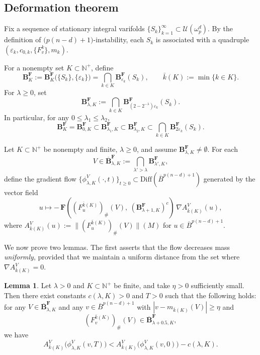 \documentclass[12pt,english]{article}
\theoremstyle{definition}
\newtheorem{lemma}[theorem]{Lemma}
\begin{document}
\subsection{Deformation theorem}\label{subsec-deform}

Fix a sequence of stationary integral varifolds \(\{S_k\}_{k=1}^\infty \subset \mathcal{U}(\omega^d_p)\). By the definition of \(\bigl(p(n-d)+1\bigr)\)-instability, each \(S_k\) is associated with a quadruple \((\varepsilon_k, c_{0,k}, \{F^k_v\}, m_k)\).

For a nonempty set \(K\subset \mathbb{N}^+\), define
\[
\mathbf{B}^{\mathbf F}_K
:= \mathbf{B}^{\mathbf F}_K\bigl(\{S_k\},\{\varepsilon_k\}\bigr)
= \bigcap_{k\in K}\mathbf{B}^{\mathbf F}_{\varepsilon_k}(S_k),
\qquad
\bar{k}(K):=\min\{k\in K\}.
\]
For \(\lambda\ge 0\), set
\[
\mathbf{B}^{\mathbf F}_{\lambda,K}
:= \bigcap_{k\in K}\mathbf{B}^{\mathbf F}_{(2-2^{-\lambda})\varepsilon_k}(S_k).
\]
In particular, for any \(0\le \lambda_1\le \lambda_2\),
\[
\mathbf{B}^{\mathbf F}_K=\mathbf{B}^{\mathbf F}_{0,K}
\subset \mathbf{B}^{\mathbf F}_{\lambda_1,K}
\subset \mathbf{B}^{\mathbf F}_{\lambda_2,K}
\subset \bigcap_{k\in K}\mathbf{B}^{\mathbf F}_{2\varepsilon_k}(S_k).
\]

Let \(K\subset \mathbb{N}^+\) be nonempty and finite, \(\lambda\ge 0\), and assume \(\mathbf{B}^{\mathbf F}_{\lambda,K}\neq\emptyset\). For each
\[
V\in \overline{\mathbf{B}}^{\mathbf F}_{\lambda,K}
:= \bigcap_{\lambda'>\lambda}\mathbf{B}^{\mathbf F}_{\lambda',K},
\]
define the gradient flow \(\{\phi^V_{\lambda,K}(\cdot,t)\}_{t\ge 0}\subset\mathrm{Diff}(\overline{B}^{p(n-d)+1})\) generated by the vector field
\[
u \longmapsto
-\,\mathbf{F}\!\left((F^{\bar{k}(K)}_{u})_{\#}(V),\ (\mathbf{B}^{\mathbf F}_{\lambda+1,K})^c\right)\,\nabla A^V_{\bar{k}(K)}(u),
\]
where \(A^V_{\bar{k}(K)}(u):=\bigl\|(F^{\bar{k}(K)}_{u})_{\#}(V)\bigr\|(M)\) for \(u\in\overline{B}^{p(n-d)+1}\).

We now prove two lemmas. The first asserts that the flow decreases mass \emph{uniformly}, provided that we maintain a uniform distance from the set where \(\nabla A^V_{\bar{k}(K)}=0\).

\begin{lemma}\label{lem:gradflow}
Let \(\lambda>0\) and \(K\subset\mathbb N^+\) be finite, and take \(\eta>0\) sufficiently small. Then there exist constants \(c(\lambda,K)>0\) and \(T>0\) such that the following holds: for any \(V\in\overline{\mathbf{B}}^{\mathbf F}_{\lambda,K}\) and any \(v\in\overline{B}^{p(n-d)+1}\) with \(|v-m_{\bar{k}(K)}(V)|\ge \eta\) and
\[
(F_v^{\bar{k}(K)})_\#(V)\in \overline{\mathbf{B}}^{\mathbf F}_{\lambda+0.5,K},
\]
we have
\[
A^V_{\bar{k}(K)}\bigl(\phi^V_{\lambda,K}(v,T)\bigr)
<
A^V_{\bar{k}(K)}\bigl(\phi^V_{\lambda,K}(v,0)\bigr)-c(\lambda,K).
\]
\end{lemma}
\end{document}
